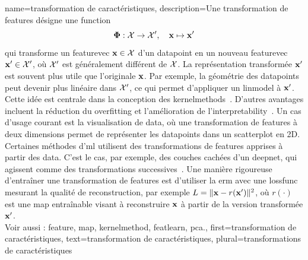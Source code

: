 {name={transformation de caractéristiques},
	description={Une transformation de \glspl{feature}  désigne une \gls{function}
		$$
		{\bf \Phi}: \mathcal{X} \rightarrow \mathcal{X}', \quad {\bf x} \mapsto {\bf x}'
		$$
		qui transforme un \gls{featurevec} ${\bf x} \in \mathcal{X}$ 
		d’un \gls{datapoint} en un nouveau \gls{featurevec} ${\bf x}' \in \mathcal{X}'$, 
		où $\mathcal{X}'$ est généralement différent de $\mathcal{X}$.
		La représentation transformée ${\bf x}'$ est souvent plus utile que l’originale ${\bf x}$. 
		Par exemple, la géométrie des \glspl{datapoint} peut devenir plus linéaire dans $\mathcal{X}'$, 
		ce qui permet d’appliquer un \gls{linmodel} à ${\bf x}'$. 
		Cette idée est centrale dans la conception des \glspl{kernelmethod}~\cite{LearningKernelsBook}.
		D’autres avantages incluent la réduction du \gls{overfitting} et l’amélioration de l’\gls{interpretability}~\cite{Ribeiro2016}. 
		Un cas d’usage courant est la visualisation de \gls{data}, où une transformation de \glspl{feature} à deux dimensions 
		permet de représenter les \glspl{datapoint} dans un \gls{scatterplot} en 2D. 
		Certaines méthodes d’\gls{ml} utilisent des transformations de \glspl{feature} apprises à partir des \gls{data}. 
		C’est le cas, par exemple, des couches cachées d’un \gls{deepnet}, qui agissent comme des transformations successives~\cite{MallatUnderstandingDeepLearning}.
		Une manière rigoureuse d’entraîner une transformation de \glspl{feature} est d’utiliser la \gls{erm} avec une \gls{lossfunc} 
		mesurant la qualité de reconstruction, par exemple $L = \|{\bf x} - r({\bf x}')\|^2$, où $r(\cdot)$ est une \gls{map} 
		entraînable visant à reconstruire ${\bf x}$ à partir de la version transformée ${\bf x}'$.
		\\
		Voir aussi : \gls{feature}, \gls{map}, \gls{kernelmethod}, \gls{featlearn}, \gls{pca}.},
	first={transformation de caractéristiques},
	text={transformation de caractéristiques}, plural={transformations de caractéristiques}
}

